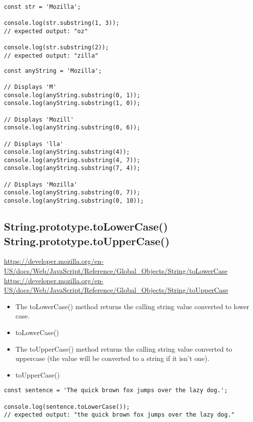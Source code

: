 \documentclass[10pt]{article}
\begin{document}
\begin{lstlisting}[title=Example substring(), captionpos=t]
const str = 'Mozilla';

console.log(str.substring(1, 3));
// expected output: "oz"

console.log(str.substring(2));
// expected output: "zilla"
\end{lstlisting}

\begin{lstlisting}[title=Example substring(), captionpos=t]
const anyString = 'Mozilla';

// Displays 'M'
console.log(anyString.substring(0, 1));
console.log(anyString.substring(1, 0));

// Displays 'Mozill'
console.log(anyString.substring(0, 6));

// Displays 'lla'
console.log(anyString.substring(4));
console.log(anyString.substring(4, 7));
console.log(anyString.substring(7, 4));

// Displays 'Mozilla'
console.log(anyString.substring(0, 7));
console.log(anyString.substring(0, 10));
\end{lstlisting}


\medskip %







\medskip %
\pagebreak
\subsection{String.prototype.toLowerCase() String.prototype.toUpperCase()}

\url{https://developer.mozilla.org/en-US/docs/Web/JavaScript/Reference/Global_Objects/String/toLowerCase}
\medskip
\url{https://developer.mozilla.org/en-US/docs/Web/JavaScript/Reference/Global_Objects/String/toUpperCase}


\begin{itemize}
	\item The toLowerCase() method returns the calling string value converted to lower case.
	\item toLowerCase()
	\item The toUpperCase() method returns the calling string value converted to uppercase (the value will be converted to a string if it isn't one).
	\item toUpperCase()
\end{itemize}

\begin{lstlisting}[title=Example toLowerCase(), captionpos=t]
const sentence = 'The quick brown fox jumps over the lazy dog.';

console.log(sentence.toLowerCase());
// expected output: "the quick brown fox jumps over the lazy dog."
\end{lstlisting}
\end{document}
